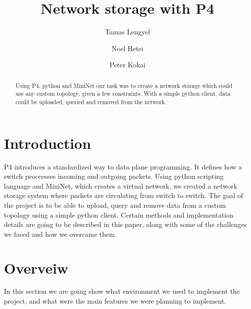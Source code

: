 \documentclass[sigconf,natbib=false]{acmart}
\begin{document}
\title{Network storage with P4}

\author{Tamas Lengyel}

\author{Noel Hetei}

\author{Peter Kokai}


\begin{abstract}
Using P4, python and MiniNet our task was to create a network storage which could use any custom topology, given a few constraints. With a simple python client, data could be uploaded, queried and removed from the network. 
\end{abstract}


\maketitle

\section{Introduction}

P4 introduces a standardized way to data plane programming. It defines how a switch proccesses incoming and outgoing packets. Using python scripting language and MiniNet\cite{mininet}, which creates a virtual network, we created a network storage system where packets are circulating from switch to switch. The goal of the project is to be able to upload, query and remove data from a custom topology using a simple python client. Certain methods and implementation details are going to be described in this paper, along with some of the challenges we faced and how we overcame them.

\section{Overveiw}
In this section we are going show what environment we used to implement the project, and what were the main features we were planning to implement.
\end{document}
